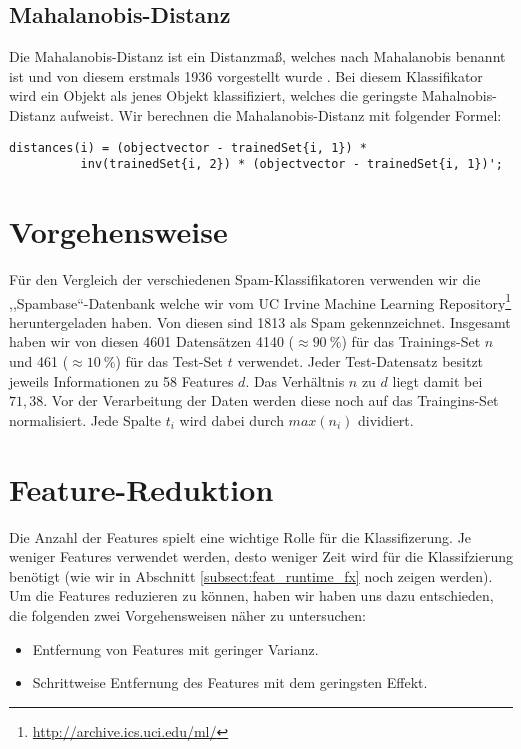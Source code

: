 \subsection{Mahalanobis-Distanz}

Die Mahalanobis-Distanz ist ein Distanzmaß, welches nach Mahalanobis benannt ist und von diesem erstmals 1936 vorgestellt wurde \cite{mahalanobis1936}. Bei diesem Klassifikator wird ein Objekt als jenes Objekt klassifiziert, welches die geringste Mahalnobis-Distanz aufweist. Wir berechnen die Mahalanobis-Distanz mit folgender Formel: 

\begin{verbatim}
distances(i) = (objectvector - trainedSet{i, 1}) *
          inv(trainedSet{i, 2}) * (objectvector - trainedSet{i, 1})';
\end{verbatim}


\section{Vorgehensweise}
\label{sec:vorgehensweise}

Für den Vergleich der verschiedenen Spam-Klassifikatoren verwenden wir die ,,Spambase``-Datenbank welche wir vom UC Irvine Machine Learning Repository\footnote{\url{http://archive.ics.uci.edu/ml/}} heruntergeladen haben. Von diesen sind 1813 als Spam gekennzeichnet. Insgesamt haben wir von diesen 4601 Datensätzen 4140 ($\approx 90~\%$) für das Trainings-Set $n$ und 461 ($\approx 10~\%$) für das Test-Set $t$ verwendet. Jeder Test-Datensatz besitzt jeweils Informationen zu 58 Features $d$. Das Verhältnis $n$ zu $d$ liegt damit bei $71,38$. Vor der Verarbeitung der Daten werden diese noch auf das Traingins-Set normalisiert. Jede Spalte $t_i$ wird dabei durch $max(n_i)$ dividiert.

\section{Feature-Reduktion}
\label{sec:feature_red}
Die Anzahl der Features spielt eine wichtige Rolle für die Klassifizerung. Je weniger Features verwendet werden, desto weniger Zeit wird für die Klassifzierung benötigt (wie wir in Abschnitt \ref{subsect:feat_runtime_fx} noch zeigen werden). Um die Features reduzieren zu können, haben wir haben uns dazu entschieden, die folgenden zwei Vorgehensweisen näher zu untersuchen:

\begin{itemize}
	\item Entfernung von Features mit geringer Varianz.
	\item Schrittweise Entfernung des Features mit dem geringsten Effekt.
\end{itemize}

